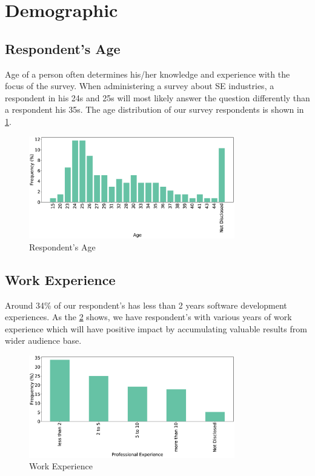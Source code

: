 \section{Demographic}
\label{demographic}

\subsection{Respondent's Age}
Age of a person often determines his/her knowledge and experience with the focus of the survey. When administering a survey about SE industries, a respondent in his 24s and 25s will most likely answer the question differently than a respondent his 35s. The age distribution of our survey respondents is shown in \ref{fig:age}.
\begin{figure}[H]
\centering
  \includegraphics[width=0.8\textwidth]{Figures/Respondents_Age}
  \caption{Respondent's Age}
  \label{fig:age}
\end{figure}

\subsection{Work Experience}
Around 34\% of our respondent's has less than 2 years software development experiences. As the \ref{fig:experience} shows, we have respondent's with various years of work experience which will have positive impact by accumulating valuable results from wider audience base.
\begin{figure}[H]
\centering
  \includegraphics[width=0.8\textwidth]{Figures/Respondents_Experience}
  \caption{Work Experience}
  \label{fig:experience}
\end{figure}

